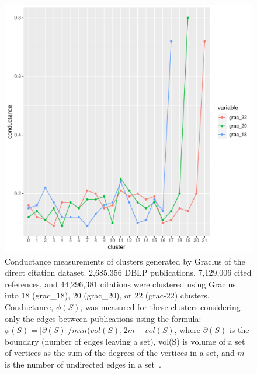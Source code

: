 \begin{figure}[ht]
\centering
\includegraphics[scale=0.6]{graclus_comparison.pdf}
\caption{Conductance measurements of clusters generated by Graclus of the direct citation dataset.  2,685,356 DBLP publications, 7,129,006 cited references, and 44,296,381 citations were clustered using Graclus into 18 (grac\_18), 20 (grac\_20), or 22 (grac-22) clusters. Conductance, $\phi(S)$, was measured for these clusters considering only the edges between publications using the formula: $\phi(S)=|\partial(S)|/min(vol(S),2m-vol(S)$, where $\partial(S)$ is the boundary (number of edges leaving a set), vol(S) is volume of a set of vertices as the sum of the degrees of the vertices in a set, and $m$ is the number of undirected edges in a set~\cite{shun_parallel_2016}.}
\label{fig:graclus_comparison_conductance}       
\end{figure}

